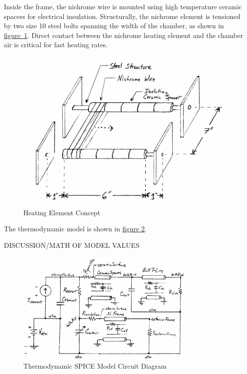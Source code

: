 \documentclass[10pt, twocolumn]{article}
\begin{document}
Inside the frame, the nichrome wire is mounted using high temperature
ceramic spacers for electrical insulation. Structurally, the nichrome
element is tensioned by two size 10 steel bolts spanning the width of the
chamber, as shown in
\mbox{\hyperref[heating-element-concept]{figure \ref{heating-element-concept}}}.
Direct contact between the nichrome heating element and the chamber air
is critical for fast heating rates.

\begin{figure}
	\centering
	\includegraphics[width=\columnwidth]{Figures/heating-element-concept.pdf}
	\caption{Heating Element Concept}
	\label{heating-element-concept}
\end{figure}

The thermodynamic model is shown in
\hyperref[thermodynamic-spice-circuit]{figure \ref{thermodynamic-spice-circuit}}.

DISCUSSION/MATH OF MODEL VALUES

\begin{figure}
	\centering
	\includegraphics[width=0.8\textwidth]{Figures/thermodynamic-spice-circuit.pdf}
	\caption{Thermodynamic SPICE Model Circuit Diagram}
	\label{thermodynamic-spice-circuit}
\end{figure}
\end{document}
